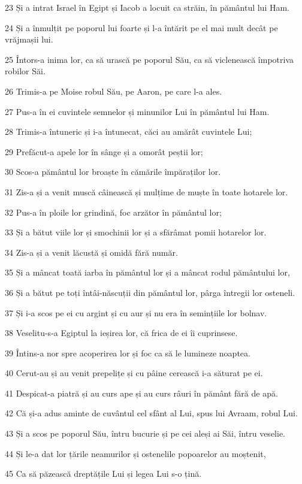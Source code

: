 \par 23 Și a intrat Israel în Egipt și Iacob a locuit ca străin, în pământul lui Ham.
\par 24 Și a înmulțit pe poporul lui foarte și l-a întărit pe el mai mult decât pe vrăjmașii lui.
\par 25 Întors-a inima lor, ca să urască pe poporul Său, ca să viclenească împotriva robilor Săi.
\par 26 Trimis-a pe Moise robul Său, pe Aaron, pe care l-a ales.
\par 27 Pus-a în ei cuvintele semnelor și minunilor Lui în pământul lui Ham.
\par 28 Trimis-a întuneric și i-a întunecat, căci au amărât cuvintele Lui;
\par 29 Prefăcut-a apele lor în sânge și a omorât peștii lor;
\par 30 Scos-a pământul lor broaște în cămările împăraților lor.
\par 31 Zis-a și a venit muscă câinească și mulțime de muște în toate hotarele lor.
\par 32 Pus-a în ploile lor grindină, foc arzător în pământul lor;
\par 33 Și a bătut viile lor și smochinii lor și a sfărâmat pomii hotarelor lor.
\par 34 Zis-a și a venit lăcustă și omidă fără număr.
\par 35 Și a mâncat toată iarba în pământul lor și a mâncat rodul pământului lor,
\par 36 Și a bătut pe toți întâi-născuții din pământul lor, pârga întregii lor osteneli.
\par 37 Și i-a scos pe ei cu argint și cu aur și nu era în semințiile lor bolnav.
\par 38 Veselitu-s-a Egiptul la ieșirea lor, că frica de ei îi cuprinsese.
\par 39 Întins-a nor spre acoperirea lor și foc ca să le lumineze noaptea.
\par 40 Cerut-au și au venit prepelițe și cu pâine cerească i-a săturat pe ei.
\par 41 Despicat-a piatră și au curs ape și au curs râuri în pământ fără de apă.
\par 42 Că și-a adus aminte de cuvântul cel sfânt al Lui, spus lui Avraam, robul Lui.
\par 43 Și a scos pe poporul Său, întru bucurie și pe cei aleși ai Săi, întru veselie.
\par 44 Și le-a dat lor țările neamurilor și ostenelile popoarelor au moștenit,
\par 45 Ca să păzească dreptățile Lui și legea Lui s-o țină.

